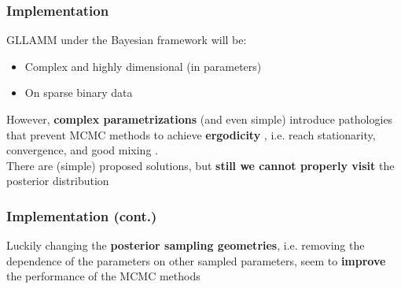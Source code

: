 \documentclass[nonav,sleutel]{beamer}
\begin{document}
	\begin{frame}
		\frametitle{Implementation}
		GLLAMM under the Bayesian framework will be:
		\begin{itemize}
			\item Complex and highly dimensional (in parameters)
			\item On sparse binary data
		\end{itemize}
		\vspace{0.3cm} However, \textbf{complex parametrizations} (and even simple) introduce pathologies that prevent MCMC methods to achieve \textbf{ergodicity} \cite{Gelfand_et_al_1995, Gelfand_et_al_1996, Papaspiliopoulos_et_al_2003, Papaspiliopoulos_et_al_2007, Betancourt_et_al_2013}, i.e. reach stationarity, convergence, and good mixing \cite{McElreath_2020}. \\
		\vspace{0.3cm} There are (simple) proposed solutions, but \textbf{still we cannot properly visit} the posterior distribution \cite{Betancourt_et_al_2013}
	\end{frame}
	\begin{frame}
		\frametitle{Implementation (cont.)}
		Luckily changing the \textbf{posterior sampling geometries}, i.e. removing the dependence of the parameters on other sampled parameters, seem to \textbf{improve} the performance of the MCMC methods \cite{Gelfand_et_al_1995, Gelfand_et_al_1996, Papaspiliopoulos_et_al_2003, Papaspiliopoulos_et_al_2007, Betancourt_et_al_2013}
	\end{frame}
\end{document}
